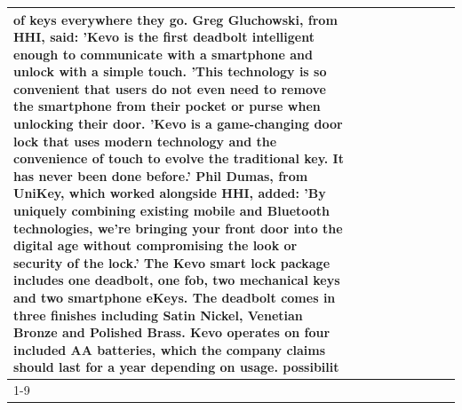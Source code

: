 \begin{table}[H]
\begin{tabular}{lllrlllll}
of keys everywhere they go. Greg Gluchowski, from HHI, said: 'Kevo is the first deadbolt intelligent enough to communicate with a smartphone and unlock with a simple touch. 'This technology is so convenient that users do not even need to remove the smartphone from their pocket or purse when unlocking their door. 'Kevo is a game-changing door lock that uses modern technology and the convenience of touch to evolve the traditional key. It has never been done before.' Phil Dumas, from UniKey, which worked alongside HHI, added: 'By uniquely combining existing mobile and Bluetooth technologies, we’re bringing your front door into the digital age without compromising the look or security of the lock.' The Kevo smart lock package includes one deadbolt, one fob, two mechanical keys and two smartphone eKeys. The deadbolt comes in three finishes including Satin Nickel, Venetian Bronze and Polished Brass. Kevo operates on four included AA batteries, which the company claims should last for a year depending on usage. possibilit \\
\cline{1-9}

\end{tabular}
\end{table}
